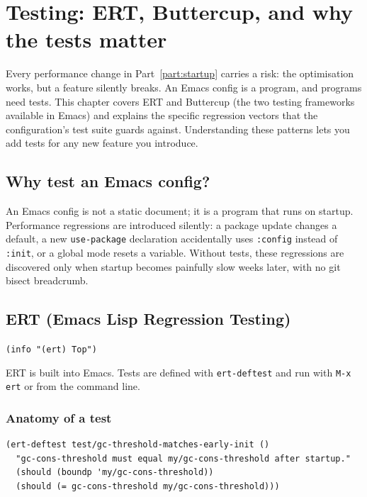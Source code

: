 \chapter{Testing: ERT, Buttercup, and why the tests matter}
\label{ch:testing}
\minitoc\label{testing-ert-buttercup-and-why-the-tests-matter}

Every performance change in Part~\ref{part:startup} carries a risk:
the optimisation works, but a feature silently breaks.
An Emacs config is a program, and programs need tests.  This chapter
covers ERT and Buttercup (the two testing frameworks available in
Emacs) and explains the specific regression vectors that the
configuration's test suite guards against.  Understanding these
patterns lets you add tests for any new feature you introduce.

\section{Why test an Emacs config?}\label{why-test-an-emacs-config}

An Emacs config is not a static document; it is a program that runs on startup. Performance regressions are introduced silently: a package update changes a default, a new \texttt{use-package} declaration accidentally uses \texttt{:config} instead of \texttt{:init}, or a global mode resets a variable. Without tests, these regressions are discovered only when startup becomes painfully slow weeks later, with no git bisect breadcrumb.

\section{ERT (Emacs Lisp Regression Testing)}\label{ert-emacs-lisp-regression-testing}

\texttt{(info "(ert) Top")}

ERT is built into Emacs. Tests are defined with \texttt{ert-deftest} and run with \texttt{M-x ert} or from the command line.

\subsection{Anatomy of a test}\label{anatomy-of-a-test}

\begin{verbatim}
(ert-deftest test/gc-threshold-matches-early-init ()
  "gc-cons-threshold must equal my/gc-cons-threshold after startup."
  (should (boundp 'my/gc-cons-threshold))
  (should (= gc-cons-threshold my/gc-cons-threshold)))
\end{verbatim}

